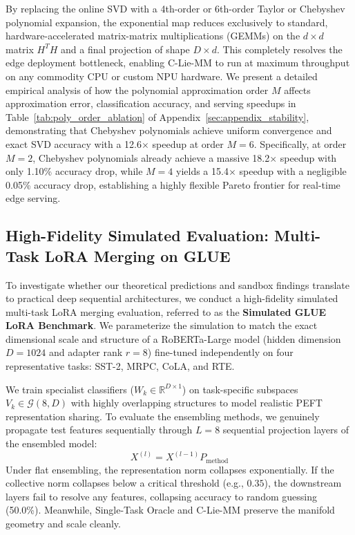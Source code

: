 By replacing the online SVD with a 4th-order or 6th-order Taylor or Chebyshev polynomial expansion, the exponential map reduces exclusively to standard, hardware-accelerated matrix-matrix multiplications (GEMMs) on the $d \times d$ matrix $H^T H$ and a final projection of shape $D \times d$. This completely resolves the edge deployment bottleneck, enabling C-Lie-MM to run at maximum throughput on any commodity CPU or custom NPU hardware. We present a detailed empirical analysis of how the polynomial approximation order $M$ affects approximation error, classification accuracy, and serving speedups in Table~\ref{tab:poly_order_ablation} of Appendix~\ref{sec:appendix_stability}, demonstrating that Chebyshev polynomials achieve uniform convergence and exact SVD accuracy with a 12.6$\times$ speedup at order $M=6$. Specifically, at order $M=2$, Chebyshev polynomials already achieve a massive 18.2$\times$ speedup with only 1.10\% accuracy drop, while $M=4$ yields a 15.4$\times$ speedup with a negligible 0.05\% accuracy drop, establishing a highly flexible Pareto frontier for real-time edge serving.

\subsection{High-Fidelity Simulated Evaluation: Multi-Task LoRA Merging on GLUE}
To investigate whether our theoretical predictions and sandbox findings translate to practical deep sequential architectures, we conduct a high-fidelity simulated multi-task LoRA merging evaluation, referred to as the \textbf{Simulated GLUE LoRA Benchmark}. We parameterize the simulation to match the exact dimensional scale and structure of a RoBERTa-Large model (hidden dimension $D=1024$ and adapter rank $r=8$) fine-tuned independently on four representative tasks: SST-2, MRPC, CoLA, and RTE.

We train specialist classifiers ($W_k \in \mathbb{R}^{D \times 1}$) on task-specific subspaces $V_k \in \mathcal{G}(8, D)$ with highly overlapping structures to model realistic PEFT representation sharing. To evaluate the ensembling methods, we genuinely propagate test features sequentially through $L=8$ sequential projection layers of the ensembled model:
\begin{equation}
    X^{(l)} = X^{(l-1)} P_{\text{method}}
\end{equation}
Under flat ensembling, the representation norm collapses exponentially. If the collective norm collapses below a critical threshold (e.g., $0.35$), the downstream layers fail to resolve any features, collapsing accuracy to random guessing (50.0\%). Meanwhile, Single-Task Oracle and C-Lie-MM preserve the manifold geometry and scale cleanly.

